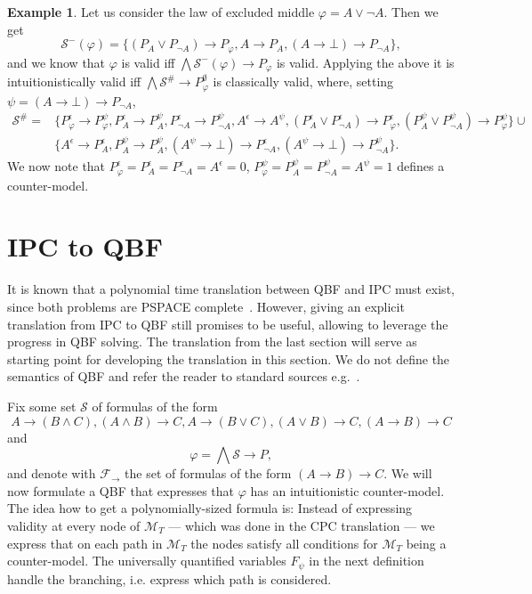 \documentclass[a4paper,11pt]{report}
\theoremstyle{definition}
\theoremstyle{definition}
\theoremstyle{definition}
\theoremstyle{definition}
\theoremstyle{definition}
\theoremstyle{definition}
\newtheorem{example}[theorem]{Example}
\theoremstyle{definition}
\begin{document}
	\begin{example}
		Let us consider the law of excluded middle $\varphi = A\vee\neg A$. Then we get
		$$\mathcal S^-(\varphi) = \{(P_A\vee P_{\neg A})\to P_\varphi, A\to P_A, (A\to \bot)\to P_{\neg A}\},$$
		and we know that $\varphi$ is valid iff $\bigwedge \mathcal S^-(\varphi)\to P_\varphi$ is valid. Applying the above it is intuitionistically valid iff $\bigwedge\mathcal S^\#\to P^\emptyset_\varphi$ is classically valid, where, setting $\psi = (A\to \bot)\to P_{\neg A}$,
		\begin{align*}
			\mathcal S^\# =&\{P_\varphi^\epsilon\to P_\varphi^{\psi}, P_A^\epsilon\to P_A^{\psi},P_{\neg A}^\epsilon\to P_{\neg A}^{\psi},A^\epsilon\to A^{\psi}, (P_A^\epsilon\vee P_{\neg A}^\epsilon)\to P_\varphi^\epsilon, (P_A^{\psi}\vee P_{\neg A}^{\psi})\to P_\varphi^{\psi}\}\cup\\ &\{A^\epsilon\to P_A^\epsilon, P_A^{\psi}\to P_A^{\psi}, (A^{\psi}\to \bot)\to P_{\neg A}^\epsilon, (A^{\psi}\to \bot)\to P_{\neg A}^{\psi}\}.
		\end{align*}
		We now note that $P_\varphi^\epsilon  = P_A^\epsilon = P_{\neg A}^\epsilon = A^\epsilon = 0$, $P_{\varphi}^{\psi} = P_A^{\psi} =  P_{\neg A}^{\psi} = A^{\psi} = 1$ defines a counter-model.
	\end{example}
	
	\section{IPC to QBF}
	
	It is known that a polynomial time translation between QBF and IPC must exist, since both problems are PSPACE complete~\cite{garey1979computers, statman1979intuitionistic}.
	However, giving an explicit translation from IPC to QBF still promises to be useful, allowing to leverage the progress in QBF solving.
	The translation from the last section will serve as starting point for developing the translation in this section.
	We do not define the semantics of QBF and refer the reader to standard sources e.g.~\cite{series/faia/2009-185}.
	
	Fix some set $\mathcal S$ of formulas of the form $$A\to (B\wedge C), (A\wedge B)\to C, A\to (B\vee C), (A\vee B)\to C, (A\to B)\to C$$and$$\varphi = \bigwedge \mathcal S\to P,$$
	and denote with $\mathcal F_\to$ the set of formulas of the form $(A\to B)\to C$. We will now formulate a QBF that expresses that $\varphi$ has an intuitionistic counter-model. The idea how to get a polynomially-sized formula is: Instead of expressing validity at every node of $\mathcal M_T$ --- which was done in the CPC translation --- we express that on each path in $\mathcal M_T$ the nodes satisfy all conditions for $\mathcal M_T$ being a counter-model. The universally quantified variables $F_\psi$ in the next definition handle the branching, i.e. express which path is considered.
	
\end{document}
